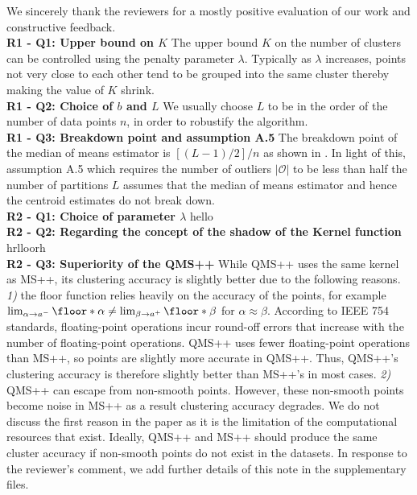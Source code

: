\documentclass{article}
\begin{document}
We sincerely thank the reviewers for a mostly positive evaluation of our work and constructive feedback.\\
\textbf{R1 - Q1: Upper bound on $K$} The upper bound $K$ on the number of clusters can be controlled using the penalty parameter $\lambda$. Typically as $\lambda$ increases, points not very close to each other tend to be grouped into the same cluster thereby making the value of $K$ shrink.  \\
\textbf{R1 - Q2: Choice of $b$ and $L$} We usually choose $L$ to be in the order of the number of data points $n$, in order to robustify the algorithm.\\
\textbf{R1 - Q3: Breakdown point and assumption A.5} The breakdown point of the median of means estimator is $[(L-1)/2]/n$ as shown in \citep{rodriguez2019breakdown}. In light of this, assumption A.5 which requires the number of outliers $|\mathcal{O}|$ to be less than half the number of partitions $L$ assumes that the median of means estimator and hence the centroid estimates do not break down.\\
\textbf{R2 - Q1: Choice of parameter $\lambda$} hello\\
\textbf{R2 - Q2: Regarding the concept of the shadow of the Kernel function} hrlloorh\\
\textbf{R2 - Q3: Superiority of the QMS++} While QMS++ uses the same kernel as MS++, its clustering accuracy is slightly better due to the following reasons. \textit{1)} the floor function relies heavily on the accuracy of the points, for example $\lim_{\alpha \to a^{-}} \floor*{\alpha} \neq \lim_{\beta \to a^{+}} \floor*{\beta}$ for $\alpha \approx \beta$. According to IEEE 754 standards, floating-point operations incur round-off errors that increase with the number of floating-point operations. QMS++ uses fewer floating-point operations than MS++, so points are slightly more accurate in QMS++. Thus, QMS++'s clustering accuracy is therefore slightly better than MS++'s in most cases. \textit{2)} QMS++ can escape from non-smooth points. However, these non-smooth points become noise in MS++ as a result clustering accuracy degrades. We do not discuss the first reason in the paper as it is the limitation of the computational resources that exist. Ideally, QMS++ and MS++ should produce the same cluster accuracy if non-smooth points do not exist in the datasets. In response to the reviewer's comment, we add further details of this note in the supplementary files.\\
\end{document}
